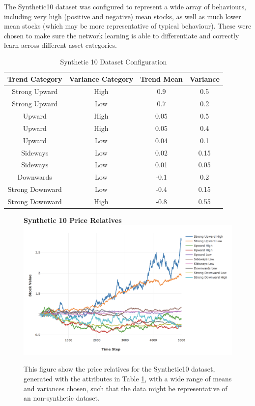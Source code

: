 \documentclass[a4paper,11pt,oneside]{article}
\theoremstyle{plain}
\theoremstyle{definition}
\begin{document}
	The Synthetic10 dataset was configured to represent a wide array of behaviours, including very high (positive and negative) mean stocks, as well as much lower mean stocks (which may be more representative of typical behaviour). These were chosen to make sure the network learning is able to differentiate and correctly learn across different asset categories.
	
	\begin{table}[H]
		\centering
		\small
		\begin{tabular}{|c|c|c|c|}
			\hline
			\textbf{Trend Category} &\textbf{Variance Category} & \textbf{Trend Mean} & \textbf{Variance}\\\hline	
			{Strong Upward} 		& {High} & {0.9} & {0.5} \\\hline
			{Strong Upward} 		& {Low} & {0.7} & {0.2} \\\hline
			{Upward} 					& {High} & {0.05} & {0.5} \\\hline
			{Upward} 					& {High} & {0.05} & {0.4} \\\hline
			{Upward} 					& {Low} & {0.04} & {0.1} \\\hline
			{Sideways} 					& {Low} & {0.02} & {0.15} \\\hline
			{Sideways}					& {Low} & {0.01} & {0.05} \\\hline
			{Downwards}				& {Low} & {-0.1} & {0.2} \\\hline
			{Strong Downward} 	& {Low} & {-0.4} & {0.15} \\\hline
			{Strong Downward}	& {High} & {-0.8} & {0.55} \\\hline
		\end{tabular}
		\newline\newline
		\caption{Synthetic 10 Dataset Configuration}\label{tab_synth10}
	\end{table}
	
	\begin{figure}[H]
		\centering
		\textbf{Synthetic 10 Price Relatives}
		\includegraphics[scale=0.35]{images/results/prices/synthetic10_prices.png} 
		\caption[Synthetic 10 Price Relatives]{This figure show the price relatives for the Synthetic10 dataset, generated with the attributes in Table \ref{tab_synth10}, with a wide range of means and variances chosen, such that the data might be representative of an non-synthetic dataset.}
		\label{figure-synthetic10_prices}
	\end{figure}
	
\end{document}
